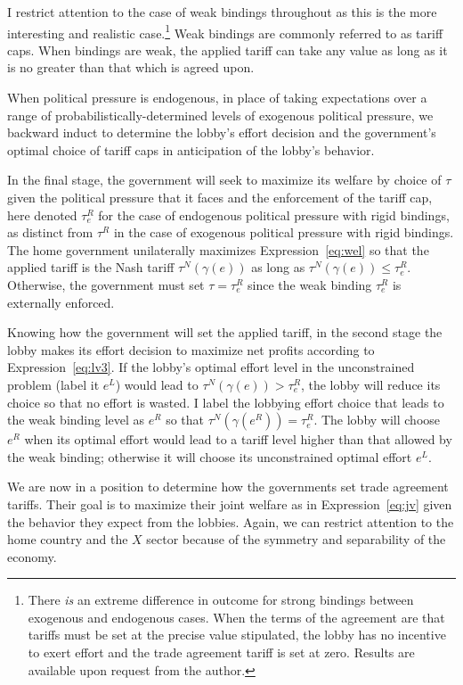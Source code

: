 \documentclass[12pt]{article}
\newcommand{\ga}{\gamma}
\begin{document}
I restrict attention to the case of weak bindings throughout as this is the more interesting and realistic case.\footnote{There \textit{is} an extreme difference in outcome for strong bindings between exogenous and endogenous cases. When the terms of the agreement are that tariffs must be set at the precise value stipulated, the lobby has no incentive to exert effort and the trade agreement tariff is set at zero. Results are available upon request from the author.} Weak bindings are commonly referred to as tariff caps. When bindings are weak, the applied tariff can take any value as long as it is no greater than that which is agreed upon.

When political pressure is endogenous, in place of taking expectations over a range of probabilistically-determined levels of exogenous political pressure, we backward induct to determine the lobby's effort decision and the government's optimal choice of tariff caps in anticipation of the lobby's behavior.

In the final stage, the government will seek to maximize its welfare by choice of $\tau$ given the political pressure that it faces and the enforcement of the tariff cap, here denoted $\tau_e^R$ for the case of endogenous political pressure with rigid bindings, as distinct from $\tau^R$ in the case of exogenous political pressure with rigid bindings. The home government unilaterally maximizes Expression~\ref{eq:wel} so that the applied tariff is the Nash tariff $\tau^N(\ga(e))$ as long as $\tau^N(\ga(e)) \leq \tau_e^R$. Otherwise, the government must set $\tau = \tau_e^R$ since the weak binding $\tau_e^R$ is externally enforced.

Knowing how the government will set the applied tariff, in the second stage the lobby makes its effort decision to maximize net profits according to Expression~\ref{eq:lv3}. If the lobby's optimal effort level in the unconstrained problem (label it $e^L$) would lead to $\tau^N(\ga(e)) > \tau_e^R$, the lobby will reduce its choice so that no effort is wasted. I label the lobbying effort choice that leads to the weak binding level as $e^R$ so that $\tau^N(\ga(e^R)) = \tau_e^R$. The lobby will choose $e^R$ when its optimal effort would lead to a tariff level higher than that allowed by the weak binding; otherwise it will choose its unconstrained optimal effort $e^L$. 

We are now in a position to determine how the governments set trade agreement tariffs. Their goal is to maximize their joint welfare as in Expression~\ref{eq:jv} given the behavior they expect from the lobbies. Again, we can restrict attention to the home country and the $X$ sector because of the symmetry and separability of the economy.
\end{document}
